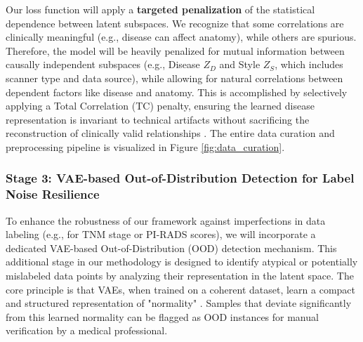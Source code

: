 \documentclass[11pt, a4paper]{article}
\begin{document}
Our loss function will apply a \textbf{targeted penalization} of the statistical dependence between latent subspaces. We recognize that some correlations are clinically meaningful (e.g., disease can affect anatomy), while others are spurious. Therefore, the model will be heavily penalized for mutual information between causally independent subspaces (e.g., Disease $Z_D$ and Style $Z_S$, which includes scanner type and data source), while allowing for natural correlations between dependent factors like disease and anatomy. 
This is accomplished by selectively applying a Total Correlation (TC) penalty, ensuring the learned disease representation is invariant to technical artifacts without sacrificing the reconstruction of clinically valid relationships \cite{FragemannArdizzone2022, AbbasiMonadjemi2018, FayCobos2023}. The entire data curation and preprocessing pipeline is visualized in Figure \ref{fig:data_curation}.

\subsubsection{Stage 3: VAE-based Out-of-Distribution Detection for Label Noise Resilience}
To enhance the robustness of our framework against imperfections in data labeling (e.g., for TNM stage or PI-RADS scores), we will incorporate a dedicated VAE-based Out-of-Distribution (OOD) detection mechanism. This additional stage in our methodology is designed to identify atypical or potentially mislabeled data points by analyzing their representation in the latent space. The core principle is that VAEs, when trained on a coherent dataset, learn a compact and structured representation of "normality" \cite{PuglisiAlexander2025,YuanStojanovski2025}. Samples that deviate significantly from this learned normality can be flagged as OOD instances for manual verification by a medical professional.
\end{document}
